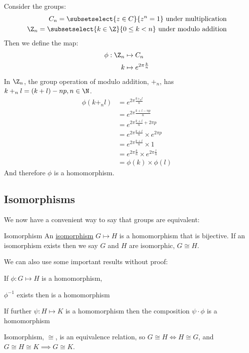 \documentclass[../Main.tex]{subfiles}
\begin{document}
\begin{example}
    \label{exZnCnHism}
    Consider the groups:
    \begin{eqnarray*}
        C_n = \subsetselect{z \in C}{z^n = 1} \text{ under multiplication} \\
        \Z_n = \subsetselect{k \in \Z}{0 \leq k < n} \text{ under modulo addition}
    \end{eqnarray*}
    Then we define the map:
    \begin{align*}
        \phi : \Z_n &\mapsto C_n \\
        k &\mapsto e^{2\pi\frac{k}{n}}
    \end{align*}
    In $\Z_n$, the group operation of modulo addition, $+_n$, has $k +_n l = (k + l) - np, n \in \N$.
    \begin{align*}
        \phi(k +_n l) &= e^{2\pi\frac{k +_n l}{n}} \\
        &= e^{2\pi\frac{k + l - np}{n}} \\
        &= e^{2\pi\frac{k + l}{n} + 2\pi p} \\
        &= e^{2\pi\frac{k+l}{n}} \times e^{2\pi p} \\
        &= e^{2\pi\frac{k+l}{n}} \times 1 \\
        &= e^{2\pi\frac{k}{n}} \times e^{2\pi\frac{l}{n}} \\
        &= \phi(k) \times \phi(l)
    \end{align*}
    And therefore $\phi$ is a homomorphism.
\end{example}
\subsection{Isomorphisms}
We now have a convenient way to say that groups are equivalent:
\begin{definition}{Isomorphism}
    An \underline{isomorphism} $G \mapsto H$ is a homomorphism that is bijective. If an isomorphism exists then we say $G$ and $H$ are isomorphic, $G \cong H$.
\end{definition}
We can also use some important results without proof:
\begin{propositions}{
        If $\phi : G \mapsto H$ is a homomorphism,
    }
    \item $\phi^{-1}$ exists then is a homomorphism
    \item If further $\psi : H \mapsto K$ is a homomorphism then the composition $\psi \cdot \phi$ is a homomorphism
    \item Isomorphism, $\cong$, is an equivalence relation, so $G \cong H \Leftrightarrow H \cong G$, and $G \cong H \cong K \implies G \cong K$.
\end{propositions}
\end{document}

